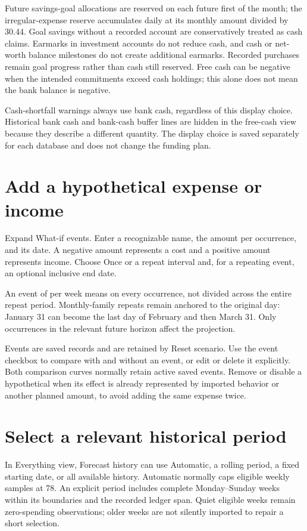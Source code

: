 Future savings-goal allocations are reserved on each future first of the month; the irregular-expense reserve accumulates daily at its monthly amount divided by 30.44. Goal savings without a recorded account are conservatively treated as cash claims. Earmarks in investment accounts do not reduce cash, and cash or net-worth balance milestones do not create additional earmarks. Recorded purchases remain goal progress rather than cash still reserved. Free cash can be negative when the intended commitments exceed cash holdings; this alone does not mean the bank balance is negative.

Cash-shortfall warnings always use bank cash, regardless of this display choice. Historical bank cash and bank-cash buffer lines are hidden in the free-cash view because they describe a different quantity. The display choice is saved separately for each database and does not change the funding plan.

\section{Add a hypothetical expense or income}
Expand What-if events. Enter a recognizable name, the amount per occurrence, and its date. A negative amount represents a cost and a positive amount represents income. Choose Once or a repeat interval and, for a repeating event, an optional inclusive end date.

An event of  per week means  on every occurrence, not  divided across the entire repeat period. Monthly-family repeats remain anchored to the original day: January 31 can become the last day of February and then March 31. Only occurrences in the relevant future horizon affect the projection.

Events are saved records and are retained by Reset scenario. Use the event checkbox to compare with and without an event, or edit or delete it explicitly. Both comparison curves normally retain active saved events. Remove or disable a hypothetical when its effect is already represented by imported behavior or another planned amount, to avoid adding the same expense twice.

\section{Select a relevant historical period}
In Everything view, Forecast history can use Automatic, a rolling period, a fixed starting date, or all available history. Automatic normally caps eligible weekly samples at 78. An explicit period includes complete Monday--Sunday weeks within its boundaries and the recorded ledger span. Quiet eligible weeks remain zero-spending observations; older weeks are not silently imported to repair a short selection.

